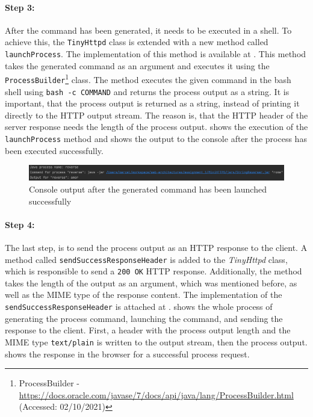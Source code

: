 \paragraph{Step 3:}
After the command has been generated, it needs to be executed in a shell. To achieve this, the \texttt{TinyHttpd} class is extended with a new method called \texttt{launchProcess}. The implementation of this method is available at . This method takes the generated command as an argument and executes it using the \texttt{ProcessBuilder}\footnote{ProcessBuilder - \url{https://docs.oracle.com/javase/7/docs/api/java/lang/ProcessBuilder.html} (Accessed: 02/10/2021)} class.
The method executes the given command in the bash shell using \texttt{bash -c COMMAND} and returns the process output as a string. It is important, that the process output is returned as a string, instead of printing it directly to the HTTP output stream. The reason is, that the HTTP header of the server response needs the length of the process output.
 shows the execution of the \texttt{launchProcess} method and  shows the output to the console after the process has been executed successfully.

\begin{figure}[h]
\centering
\includegraphics[scale=0.3]{images/implementationOutput}
\caption{Console output after the generated command has been launched successfully}
\label{fig:01_part1_impl_output}
\end{figure}


\paragraph{Step 4:}
The last step, is to send the process output as an HTTP response to the client.
A method called \texttt{sendSuccessResponseHeader} is added to the \textit{TinyHttpd} class, which is responsible to send a \texttt{200 OK} HTTP response. Additionally, the method takes the length of the output as an argument, which was mentioned before, as well as the MIME type of the response content. The implementation of the \texttt{sendSuccessResponseHeader} is attached at .
 shows the whole process of generating the process command, launching the command, and sending the response to the client. First, a header with the process output length and the MIME type \texttt{text/plain} is written to the output stream, then the process output.  shows the response in the browser for a successful process request.


